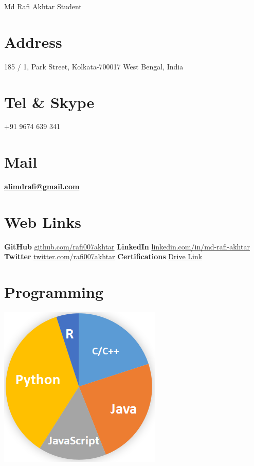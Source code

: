 \documentclass[]{friggeri-cv}
\begin{document}
\header {} {Md Rafi Akhtar}
      {Student}
      

\begin{aside}
  \section{Address}
    185 / 1, Park Street, Kolkata-700017
    West Bengal, India
    ~
  \section{Tel \& Skype}
    +91 9674 639 341
    ~
  \section{Mail}
    \href{mailto:alimdrafi.com}{\textbf{alimdrafi@gmail.com}}
    ~
  \section{Web Links}
    \textbf{GitHub} \href{https://github.com/rafi007akhtar}{github.com/rafi007akhtar}
    \textbf{LinkedIn} \href{https://www.linkedin.com/in/md-rafi-akhtar}{linkedin.com/in/md-rafi-akhtar}
    \textbf{Twitter} \href{https://twitter.com/rafi007akhtar}{twitter.com/rafi007akhtar}
    \textbf{Certifications}
    \href{https://drive.google.com/open?id=1yXkhjvAwEwfuUrkH_Ks33mNrBGWDfhWL}{Drive Link}
    ~
  \section{Programming}
    \includegraphics[scale=0.5]{img/languages.png}
    ~

\end{aside}
\end{document}
